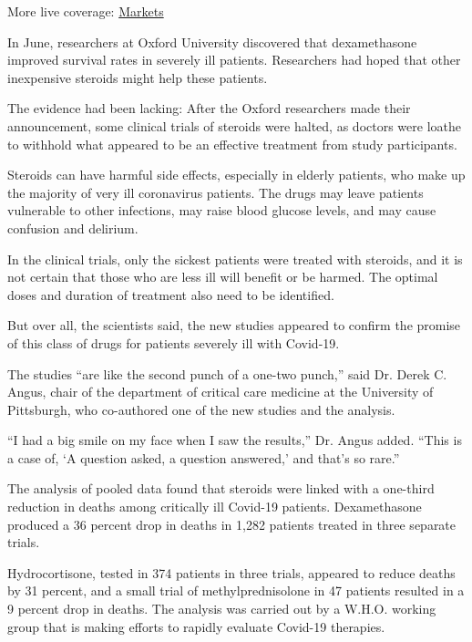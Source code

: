 More live coverage:
\href{https://www.nytimes3xbfgragh.onion/live/2020/09/11/business/stock-market-today-coronavirus?action=click\&pgtype=Article\&state=default\&region=MAIN_CONTENT_1\&context=storylines_live_updates}{Markets}

In June, researchers at Oxford University discovered that dexamethasone
improved survival rates in severely ill patients. Researchers had hoped
that other inexpensive steroids might help these patients.

The evidence had been lacking: After the Oxford researchers made their
announcement, some clinical trials of steroids were halted, as doctors
were loathe to withhold what appeared to be an effective treatment from
study participants.

Steroids can have harmful side effects, especially in elderly patients,
who make up the majority of very ill coronavirus patients. The drugs may
leave patients vulnerable to other infections, may raise blood glucose
levels, and may cause confusion and delirium.

In the clinical trials, only the sickest patients were treated with
steroids, and it is not certain that those who are less ill will benefit
or be harmed. The optimal doses and duration of treatment also need to
be identified.

But over all, the scientists said, the new studies appeared to confirm
the promise of this class of drugs for patients severely ill with
Covid-19.

The studies ``are like the second punch of a one-two punch,'' said Dr.
Derek C. Angus, chair of the department of critical care medicine at the
University of Pittsburgh, who co-authored one of the new studies and the
analysis.

``I had a big smile on my face when I saw the results,'' Dr. Angus
added. ``This is a case of, `A question asked, a question answered,' and
that's so rare.''

The analysis of pooled data found that steroids were linked with a
one-third reduction in deaths among critically ill Covid-19 patients.
Dexamethasone produced a 36 percent drop in deaths in 1,282 patients
treated in three separate trials.

Hydrocortisone, tested in 374 patients in three trials, appeared to
reduce deaths by 31 percent, and a small trial of methylprednisolone in
47 patients resulted in a 9 percent drop in deaths. The analysis was
carried out by a W.H.O. working group that is making efforts to rapidly
evaluate Covid-19 therapies.

